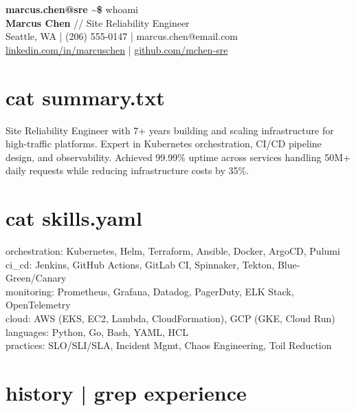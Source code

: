 \documentclass[9.5pt,a4paper]{article}
\begin{document}
\begin{tcolorbox}[colback=darkbg,colframe=termgreen,boxrule=1pt,arc=0pt,left=8pt,right=8pt,top=6pt,bottom=6pt]
{\color{termgreen}\bfseries\large marcus.chen@sre \~{}\$} {\color{white}\large whoami}\\[4pt]
{\color{white}\bfseries\Large Marcus Chen} {\color{dimtext}// Site Reliability Engineer}\\[4pt]
{\color{dimtext}\small Seattle, WA | (206) 555-0147 | marcus.chen@email.com}\\
{\color{dimtext}\small \href{https://linkedin.com/in/marcuschen}{linkedin.com/in/marcuschen} | \href{https://github.com/mchen-sre}{github.com/mchen-sre}}
\end{tcolorbox}

\section{cat summary.txt}
Site Reliability Engineer with 7+ years building and scaling infrastructure for high-traffic platforms. Expert in Kubernetes orchestration, CI/CD pipeline design, and observability. Achieved 99.99\% uptime across services handling 50M+ daily requests while reducing infrastructure costs by 35\%.

\section{cat skills.yaml}
{\color{termgreen}orchestration:} Kubernetes, Helm, Terraform, Ansible, Docker, ArgoCD, Pulumi\\
{\color{termgreen}ci\_cd:} Jenkins, GitHub Actions, GitLab CI, Spinnaker, Tekton, Blue-Green/Canary\\
{\color{termgreen}monitoring:} Prometheus, Grafana, Datadog, PagerDuty, ELK Stack, OpenTelemetry\\
{\color{termgreen}cloud:} AWS (EKS, EC2, Lambda, CloudFormation), GCP (GKE, Cloud Run)\\
{\color{termgreen}languages:} Python, Go, Bash, YAML, HCL\\
{\color{termgreen}practices:} SLO/SLI/SLA, Incident Mgmt, Chaos Engineering, Toil Reduction

\section{history | grep experience}
\end{document}

